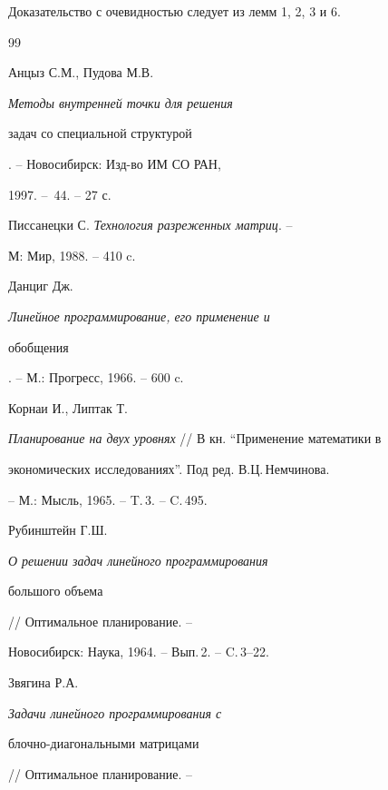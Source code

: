 Доказательство с очевидностью следует из лемм 1, 2, 3 и 6.





\begin{thebibliography}{99}







Анцыз С.М., Пудова М.В.


{\em Методы внутренней точки для решения


задач со специальной структурой}. -- Новосибирск: Изд-во ИМ СО РАН,


1997. -- \No\,44. -- 27 с.







Писсанецки С. {\em Технология разреженных матриц}. --


М: Мир, 1988. -- 410 c.







Данциг Дж. {\em Линейное программирование, его применение и


обобщения}. --  М.: Прогресс, 1966. -- 600 c.







Корнаи И., Липтак Т. 


{\em Планирование на двух уровнях} // В кн. ``Применение математики в


экономических исследованиях''. Под ред. В.Ц.\,Немчинова.


-- М.: Мысль, 1965. -- T.\,3. -- C.\,495.







Рубинштейн Г.Ш. {\em О решении задач линейного программирования


большого объема} // Оптимальное планирование. -- 


Новосибирск: Наука, 1964. -- Вып.\,2. -- C.\,3--22.







Звягина Р.А. {\em Задачи линейного программирования с


блочно-диагональными матрицами} // Оптимальное планирование. --



\end{thebibliography}
